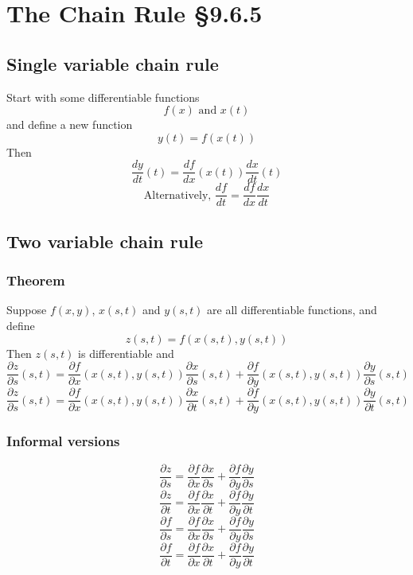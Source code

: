 \documentclass[11pt]{article}
\begin{document}
\section{The Chain Rule §9.6.5}
\subsection{Single variable chain rule}
Start with some differentiable functions
\[ f(x) \text{ and } x(t) \]
and define a new function
\[ y(t) = f(x(t)) \]
Then
\[ \frac{dy}{dt}(t) = \frac{df}{dx}\left( x(t) \right) \frac{dx}{dt}(t) \]
\[ \text{Alternatively, } \dfrac{df}{dt} = \dfrac{df}{dx} \dfrac{dx}{dt} \]

\subsection{Two variable chain rule}
\subsubsection{Theorem}
Suppose $f(x, y)$, $x(s, t)$ and $y(s, t)$ are all differentiable functions, and define
\[ z(s, t) = f(x(s,t), y(s,t)) \]
Then $z(s, t)$ is differentiable and
\[ \frac{\partial z}{\partial s}(s, t) = \frac{\partial f}{\partial x} \left( x(s, t), y(s, t) \right) \frac{\partial x}{\partial s}(s, t) + \frac{\partial f}{\partial y} \left( x(s, t), y(s, t) \right) \frac{\partial y}{\partial s}(s, t) \]
\[ \frac{\partial z}{\partial s}(s, t) = \frac{\partial f}{\partial x} \left( x(s, t), y(s, t) \right) \frac{\partial x}{\partial t}(s, t) + \frac{\partial f}{\partial y} \left( x(s, t), y(s, t) \right) \frac{\partial y}{\partial t}(s, t) \]

\subsubsection{Informal versions}
\[ \frac{\partial z}{\partial s} = \frac{\partial f}{\partial x} \frac{\partial x}{\partial s} + \frac{\partial f}{\partial y} \frac{\partial y}{\partial s} \]
\[ \frac{\partial z}{\partial t} = \frac{\partial f}{\partial x} \frac{\partial x}{\partial t} + \frac{\partial f}{\partial y} \frac{\partial y}{\partial t} \]
\[ \frac{\partial f}{\partial s} = \frac{\partial f}{\partial x} \frac{\partial x}{\partial s} + \frac{\partial f}{\partial y} \frac{\partial y}{\partial s} \]
\[ \frac{\partial f}{\partial t} = \frac{\partial f}{\partial x} \frac{\partial x}{\partial t} + \frac{\partial f}{\partial y} \frac{\partial y}{\partial t} \]
\end{document}
